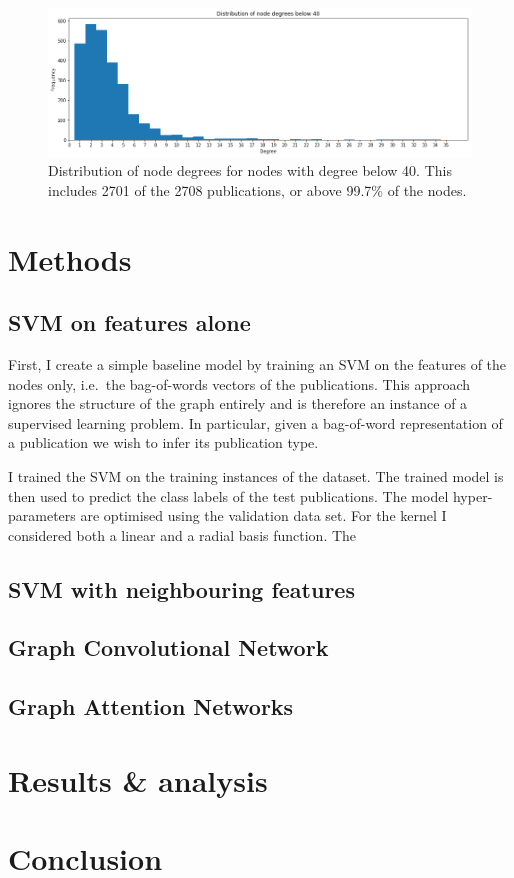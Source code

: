 \documentclass[12pt]{article}
\theoremstyle{definition}
\begin{document}
\begin{figure}[h]
	\includegraphics[width=1.0\textwidth]{node_degrees_truncated}
	\centering
	\caption{Distribution of node degrees for nodes with degree below 40. This includes 2701 of the 2708 publications, or above 99.7\% of the nodes.}
	\label{fig/node_degrees_truncated}
\end{figure}

\section{Methods}
\subsection{SVM on features alone}
First, I create a simple baseline model by training an SVM on the features of the nodes only, i.e.\ the bag-of-words vectors of the publications. This approach ignores the structure of the graph entirely and is therefore an instance of a supervised learning problem. In particular, given a bag-of-word representation of a publication we wish to infer its publication type. 

I trained the SVM on the training instances of the dataset. The trained model is then used to predict the class labels of the test publications. The model hyper-parameters are optimised using the validation data set. For the kernel I considered both a linear and a radial basis function. The 
\subsection{SVM with neighbouring features}
\subsection{Graph Convolutional Network}
\subsection{Graph Attention Networks}

\section{Results \& analysis}

\section{Conclusion}



\end{document}
